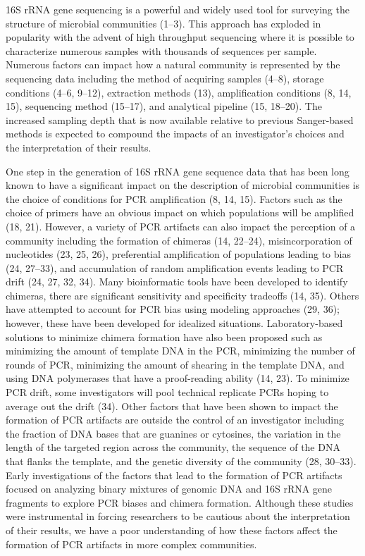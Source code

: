 \documentclass[11pt,]{article}
\begin{document}
16S rRNA gene sequencing is a powerful and widely used tool for
surveying the structure of microbial communities (1--3). This approach
has exploded in popularity with the advent of high throughput sequencing
where it is possible to characterize numerous samples with thousands of
sequences per sample. Numerous factors can impact how a natural
community is represented by the sequencing data including the method of
acquiring samples (4--8), storage conditions (4--6, 9--12), extraction
methods (13), amplification conditions (8, 14, 15), sequencing method
(15--17), and analytical pipeline (15, 18--20). The increased sampling
depth that is now available relative to previous Sanger-based methods is
expected to compound the impacts of an investigator's choices and the
interpretation of their results.

One step in the generation of 16S rRNA gene sequence data that has been
long known to have a significant impact on the description of microbial
communities is the choice of conditions for PCR amplification (8, 14,
15). Factors such as the choice of primers have an obvious impact on
which populations will be amplified (18, 21). However, a variety of PCR
artifacts can also impact the perception of a community including the
formation of chimeras (14, 22--24), misincorporation of nucleotides (23,
25, 26), preferential amplification of populations leading to bias (24,
27--33), and accumulation of random amplification events leading to PCR
drift (24, 27, 32, 34). Many bioinformatic tools have been developed to
identify chimeras, there are significant sensitivity and specificity
tradeoffs (14, 35). Others have attempted to account for PCR bias using
modeling approaches (29, 36); however, these have been developed for
idealized situations. Laboratory-based solutions to minimize chimera
formation have also been proposed such as minimizing the amount of
template DNA in the PCR, minimizing the number of rounds of PCR,
minimizing the amount of shearing in the template DNA, and using DNA
polymerases that have a proof-reading ability (14, 23). To minimize PCR
drift, some investigators will pool technical replicate PCRs hoping to
average out the drift (34). Other factors that have been shown to impact
the formation of PCR artifacts are outside the control of an
investigator including the fraction of DNA bases that are guanines or
cytosines, the variation in the length of the targeted region across the
community, the sequence of the DNA that flanks the template, and the
genetic diversity of the community (28, 30--33). Early investigations of
the factors that lead to the formation of PCR artifacts focused on
analyzing binary mixtures of genomic DNA and 16S rRNA gene fragments to
explore PCR biases and chimera formation. Although these studies were
instrumental in forcing researchers to be cautious about the
interpretation of their results, we have a poor understanding of how
these factors affect the formation of PCR artifacts in more complex
communities.
\end{document}
